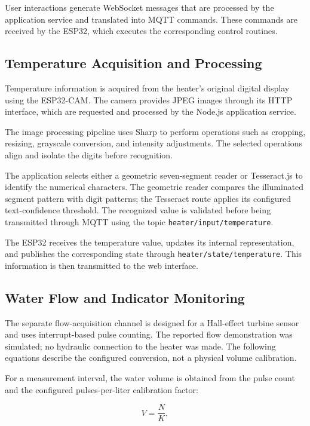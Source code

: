 User interactions generate WebSocket messages that are processed by the application service and translated into MQTT commands.
These commands are received by the ESP32, which executes the corresponding control routines.

\subsection{Temperature Acquisition and Processing}

Temperature information is acquired from the heater's original digital display using the ESP32-CAM.
The camera provides JPEG images through its HTTP interface, which are requested and processed by the Node.js application service.

The image processing pipeline uses Sharp to perform operations such as cropping, resizing, grayscale conversion, and intensity adjustments.
The selected operations align and isolate the digits before recognition.

The application selects either a geometric seven-segment reader or Tesseract.js to identify the numerical characters. The geometric reader compares the illuminated segment pattern with digit patterns; the Tesseract route applies its configured text-confidence threshold.
The recognized value is validated before being transmitted through MQTT using the topic \texttt{heater/input/temperature}.

The ESP32 receives the temperature value, updates its internal representation, and publishes the corresponding state through
\texttt{heater/state/temperature}. This information is then transmitted to the web interface.

\subsection{Water Flow and Indicator Monitoring}

The separate flow-acquisition channel is designed for a Hall-effect turbine sensor and uses interrupt-based pulse counting. The reported flow demonstration was simulated; no hydraulic connection to the heater was made. The following equations describe the configured conversion, not a physical volume calibration.

For a measurement interval, the water volume is obtained from the pulse count and the configured pulses-per-liter calibration factor:

\begin{equation}
    V = \frac{N}{K},
    \label{eq:water-volume}
\end{equation}

